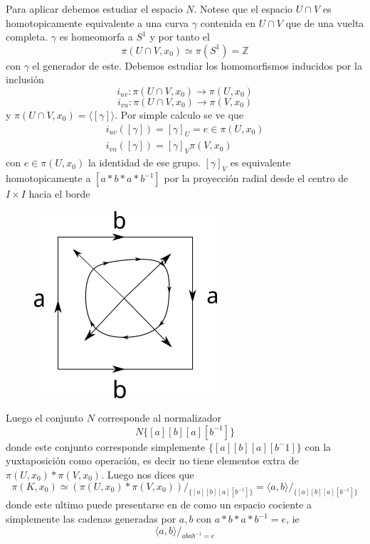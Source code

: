\begin{ejemplo}
  Para aplicar \vank debemos estudiar el espacio \(N\). Notese que el
  espacio \(U \cap V\) es homotopicamente equivalente a una curva
  \(\gamma\) contenida en \(U \cap V\) que de una vuelta completa.
  \(\gamma\) es homeomorfa a \(S^1\) y por tanto el
  \[\pi (U \cap V, x_0) \simeq \pi (S^1) = \mathbb Z \]
  con \(\gamma\) el generador de este. Debemos estudiar los
  homomorfismos inducidos por la inclusión
  \[ i_{u v} : \pi (U \cap V , x_0) \longrightarrow \pi (U, x_0) \]
  \[ i_{v u} : \pi (U \cap V , x_0) \longrightarrow \pi (V, x_0) \]
  y \(  \pi (U \cap V , x_0) = \langle {[\gamma]} \rangle \). Por
  simple calculo se ve que
  \begin{gather*}
    i_{u v} ([\gamma]) = [\gamma]_{U} = e \in \pi \left( U, x_0 \right)
    \\
    i_{v u} ([\gamma]) = [\gamma]_{V} \pi \left( V, x_0 \right)
  \end{gather*}
  con \(e \in \pi \left( U, x_0 \right)\) la identidad de ese grupo.
  \([\gamma]_V\) es equivalente homotopicamente a \([a * b * a *
  b^{-1}]\) por la proyección radial desde el centro de \(I \times I\)
  hacia el borde
  \begin{figure}[h]
    \centering \includegraphics[scale=0.5]{./imagenes/radial.png}
  \end{figure}
  Luego el conjunto \(N\) corresponde al normalizador
  \[ N \{ [a] [b] [a] [b^{-1}]\}\]
  donde este conjunto corresponde simplemente \(\{ [a] [b] [a]
  [b^-1]\}\) con la yuxtaposición como operación, es decir no tiene
  elementos extra de \(\pi (U,x_0) * \pi (V, x_0)\). Luego \vank nos
  dices que
  \[ \pi (K, x_0) \simeq \left( \pi (U, x_0) * \pi (V, x_0) \right)
      /_{\{[a] [b] [a] [b^{-1}]\}} = \langle {a , b} \rangle
      /_{\{[a] [b] [a] [b^{-1}]\}}\]
  donde este ultimo puede presentarse en de como un espacio cociente a
  simplemente las cadenas generadas por \(a,b\) con \(a * b * a * b^{-1}
  = e\), ie
  \[ \langle a,b \rangle /_{abab^{-1} = e} \]
\end{ejemplo}

